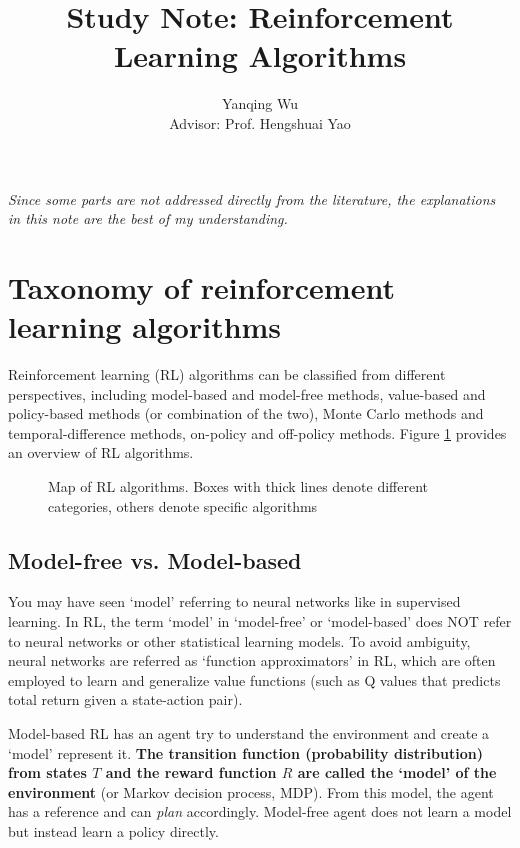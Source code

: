 \documentclass[lang=en,mode=normal,device=normal,color=blue,12pt]{elegantnote}
\title{Study Note: Reinforcement Learning Algorithms}
\author{Yanqing Wu\\[0.5cm]{Advisor: Prof. Hengshuai Yao}}
\institute{Viwistar Robotics}
\DeclareMathOperator*{\1}{\mathbbm{1}}
\begin{document}
\maketitle

\tableofcontents

\newpage

\textit{Since some parts are not addressed directly from the literature, the explanations in this note are the best of my understanding.}

\newpage
\section{Taxonomy of reinforcement learning algorithms}

Reinforcement learning (RL) algorithms can be classified from different perspectives, including model-based and model-free methods, value-based and policy-based methods (or combination of the two), Monte Carlo methods and temporal-difference methods, on-policy and off-policy methods. Figure \ref{fig:taxonomy} provides an overview of RL algorithms.

\begin{figure}[!ht]
  \centering
  \caption{Map of RL algorithms. Boxes with thick lines denote different categories, others denote specific algorithms \cite{Zhang2020}}
  \label{fig:taxonomy}
\end{figure}

\subsection{Model-free vs. Model-based}
\label{appendix:model-dep}

You may have seen `model' referring to neural networks like in supervised learning.
In RL, the term `model' in `model-free' or `model-based' does NOT refer to neural networks or other statistical learning models.
To avoid ambiguity, neural networks are referred as `function approximators' in RL, which are often employed to learn and generalize value functions (such as Q values that predicts total return given a state-action pair).

Model-based RL has an agent try to understand the environment and create a `model' represent it.
\textbf{The transition function (probability distribution) from states $T$ and the reward function $R$ are called the `model' of the environment} (or Markov decision process, MDP).
From this model, the agent has a reference and can \textit{plan} accordingly. Model-free agent does not learn a model but instead learn a policy directly.
\end{document}
